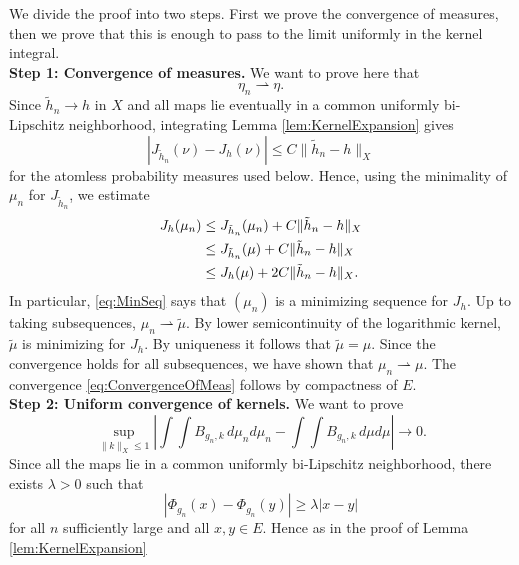 \documentclass[11pt]{article}
\theoremstyle{plain}
\numberwithin{equation}{section}
\theoremstyle{definition}
\let\oldendproof\endproof
\renewenvironment{proof}[1][\proofname]{%
\oldproof[\upshape \bfseries #1]%
}{\oldendproof}
\begin{document}
\begin{proof}
    We divide the proof into two steps. First we prove the convergence of measures, then we prove that this is enough to pass to the limit uniformly in the kernel integral.\\
    \textbf{Step 1: Convergence of measures.} We want to prove here that
    \begin{equation}
        \label{eq:ConvergenceOfMeas}
        \eta_n \rightharpoonup \eta.
    \end{equation}
    Since $\tilde h_n\to h$ in $X$ and all maps lie eventually in a common uniformly bi-Lipschitz neighborhood, integrating Lemma \ref{lem:KernelExpansion} gives
    \begin{equation}
        \label{eq:JBound}
        |J_{\tilde h_n}(\nu)-J_h(\nu)|
        \leq C\|\tilde h_n-h\|_X
    \end{equation}
    for the atomless probability measures used below. Hence, using the minimality of $\mu_n$ for $J_{\tilde h_n}$, we estimate
    \begin{align}
        \label{eq:MinSeq}
        J_h(\mu_n)
        &\leq J_{\tilde h_n}(\mu_n)+C\|\tilde h_n-h\|_X  \notag\\
        &\leq J_{\tilde h_n}(\mu)+C\|\tilde h_n-h\|_X \notag\\
        &\leq J_h(\mu)+2C\|\tilde h_n-h\|_X .
    \end{align}
    In particular, \eqref{eq:MinSeq} says that $(\mu_n)$ is a minimizing sequence for $J_h$. Up to taking subsequences, $\mu_n\rightharpoonup \tilde\mu$. By lower semicontinuity of the logarithmic kernel, $\tilde\mu$ is minimizing for $J_h$. By uniqueness it follows that $\tilde\mu=\mu$. Since the convergence holds for all subsequences, we have shown that $\mu_n\rightharpoonup\mu$. The convergence \eqref{eq:ConvergenceOfMeas} follows by compactness of $E$.\\
    \textbf{Step 2: Uniform convergence of kernels.} We want to prove
    \begin{equation}
        \label{eq:KernelConv}
        \sup_{\|k\|_X\leq 1}
        \left|
            \int\int B_{g_n,k}\,d\mu_n d\mu_n
            -
            \int\int B_{g_n,k}\,d\mu d\mu
        \right|
        \to 0.
    \end{equation}
    Since all the maps lie in a common uniformly bi-Lipschitz neighborhood, there exists $\lambda>0$ such that
    \[
        |\Phi_{g_n}(x)-\Phi_{g_n}(y)|\geq \lambda |x-y|
    \]
    for all $n$ sufficiently large and all $x,y\in E$. Hence as in the proof of Lemma \ref{lem:KernelExpansion}

\end{proof}
\end{document}

